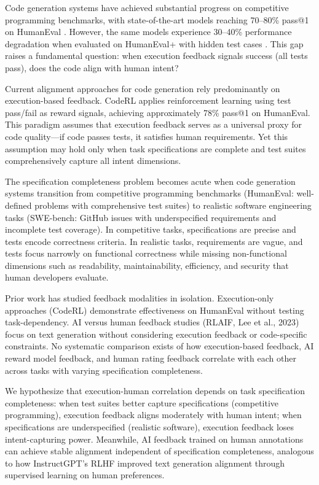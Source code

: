 
Code generation systems have achieved substantial progress on competitive programming benchmarks, with state-of-the-art models reaching 70--80\% pass@1 on HumanEval \citep{chen2021evaluating}. However, the same models experience 30--40\% performance degradation when evaluated on HumanEval+ with hidden test cases \citep{liu2023your}. This gap raises a fundamental question: when execution feedback signals success (all tests pass), does the code align with human intent?

Current alignment approaches for code generation rely predominantly on execution-based feedback. CodeRL \citep{le2022coderl} applies reinforcement learning using test pass/fail as reward signals, achieving approximately 78\% pass@1 on HumanEval. This paradigm assumes that execution feedback serves as a universal proxy for code quality---if code passes tests, it satisfies human requirements. Yet this assumption may hold only when task specifications are complete and test suites comprehensively capture all intent dimensions.

The specification completeness problem becomes acute when code generation systems transition from competitive programming benchmarks (HumanEval: well-defined problems with comprehensive test suites) to realistic software engineering tasks (SWE-bench: GitHub issues with underspecified requirements and incomplete test coverage). In competitive tasks, specifications are precise and tests encode correctness criteria. In realistic tasks, requirements are vague, and tests focus narrowly on functional correctness while missing non-functional dimensions such as readability, maintainability, efficiency, and security that human developers evaluate.

Prior work has studied feedback modalities in isolation. Execution-only approaches (CodeRL) demonstrate effectiveness on HumanEval without testing task-dependency. AI versus human feedback studies (RLAIF, Lee et al., 2023) focus on text generation without considering execution feedback or code-specific constraints. No systematic comparison exists of how execution-based feedback, AI reward model feedback, and human rating feedback correlate with each other across tasks with varying specification completeness.

We hypothesize that execution-human correlation depends on task specification completeness: when test suites better capture specifications (competitive programming), execution feedback aligns moderately with human intent; when specifications are underspecified (realistic software), execution feedback loses intent-capturing power. Meanwhile, AI feedback trained on human annotations can achieve stable alignment independent of specification completeness, analogous to how InstructGPT's RLHF \citep{ouyang2022training} improved text generation alignment through supervised learning on human preferences.

